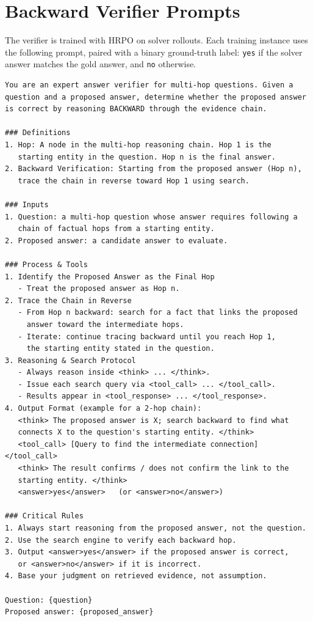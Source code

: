 \documentclass{article}
\begin{document}
\section{Backward Verifier Prompts}
\label{app:verifier_prompts}

The verifier is trained with HRPO on solver rollouts. Each training instance
uses the following prompt, paired with a binary ground-truth label:
\texttt{yes} if the solver answer matches the gold answer, and \texttt{no}
otherwise.

\begin{tcolorbox}[verifybox, title={Backward Verifier Training Prompt}, breakable]
\small
\begin{verbatim}
You are an expert answer verifier for multi-hop questions. Given a
question and a proposed answer, determine whether the proposed answer
is correct by reasoning BACKWARD through the evidence chain.

### Definitions
1. Hop: A node in the multi-hop reasoning chain. Hop 1 is the
   starting entity in the question. Hop n is the final answer.
2. Backward Verification: Starting from the proposed answer (Hop n),
   trace the chain in reverse toward Hop 1 using search.

### Inputs
1. Question: a multi-hop question whose answer requires following a
   chain of factual hops from a starting entity.
2. Proposed answer: a candidate answer to evaluate.

### Process & Tools
1. Identify the Proposed Answer as the Final Hop
   - Treat the proposed answer as Hop n.
2. Trace the Chain in Reverse
   - From Hop n backward: search for a fact that links the proposed
     answer toward the intermediate hops.
   - Iterate: continue tracing backward until you reach Hop 1,
     the starting entity stated in the question.
3. Reasoning & Search Protocol
   - Always reason inside <think> ... </think>.
   - Issue each search query via <tool_call> ... </tool_call>.
   - Results appear in <tool_response> ... </tool_response>.
4. Output Format (example for a 2-hop chain):
   <think> The proposed answer is X; search backward to find what
   connects X to the question's starting entity. </think>
   <tool_call> [Query to find the intermediate connection] </tool_call>
   <think> The result confirms / does not confirm the link to the
   starting entity. </think>
   <answer>yes</answer>   (or <answer>no</answer>)

### Critical Rules
1. Always start reasoning from the proposed answer, not the question.
2. Use the search engine to verify each backward hop.
3. Output <answer>yes</answer> if the proposed answer is correct,
   or <answer>no</answer> if it is incorrect.
4. Base your judgment on retrieved evidence, not assumption.

Question: {question}
Proposed answer: {proposed_answer}
\end{verbatim}
\end{tcolorbox}
\end{document}
